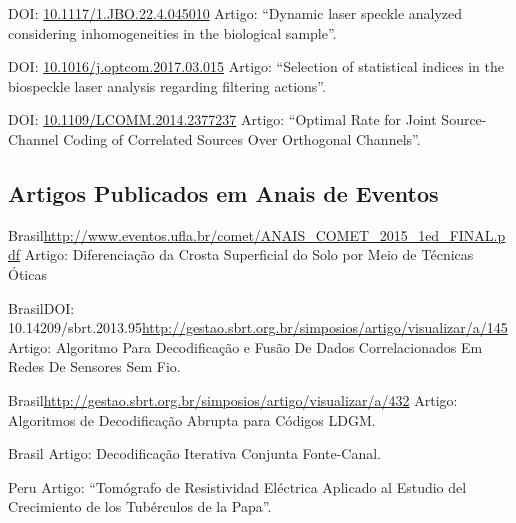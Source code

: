 \documentclass[11pt,a4paper,sans]{moderncv} %
\newcommand{\doiurl}[1]{\href{https://doi.org/#1}{#1}}
\begin{document}
	      {DOI: \doiurl{10.1117/1.JBO.22.4.045010}}{}{}
	      {Artigo: ``Dynamic laser speckle analyzed considering inhomogeneities in the biological sample''.}
	      
	      {DOI: \doiurl{10.1016/j.optcom.2017.03.015}}{}{}
	      {Artigo: ``Selection of statistical indices in the biospeckle laser analysis regarding filtering actions''.}
	      
	      {DOI: \doiurl{10.1109/LCOMM.2014.2377237}}{}{}
	      {Artigo: ``Optimal  Rate for Joint Source-Channel Coding of Correlated Sources Over Orthogonal Channels''.}

\subsection{Artigos Publicados em Anais de Eventos}

	      {Brasil}{}{\url{http://www.eventos.ufla.br/comet/ANAIS\_COMET\_2015\_1ed\_FINAL.pdf}}
	      {Artigo: Diferenciação da Crosta Superficial do Solo por Meio de Técnicas Óticas}

	      {Brasil}{DOI: 10.14209/sbrt.2013.95}{\url{http://gestao.sbrt.org.br/simposios/artigo/visualizar/a/145}}
	      {Artigo: Algoritmo Para Decodificação e Fusão De Dados Correlacionados Em Redes De Sensores Sem Fio.}

	      {Brasil}{}{\url{http://gestao.sbrt.org.br/simposios/artigo/visualizar/a/432}}
	      {Artigo: Algoritmos de Decodificação Abrupta para Códigos LDGM.}

	      {Brasil}{}{}%
	      {Artigo: Decodificação Iterativa Conjunta Fonte-Canal.}

	      {Peru}{}{}
	      {Artigo: ``Tomógrafo de Resistividad Eléctrica Aplicado al Estudio del Crecimiento de los Tubérculos de la Papa''.}


	       
\end{document}
